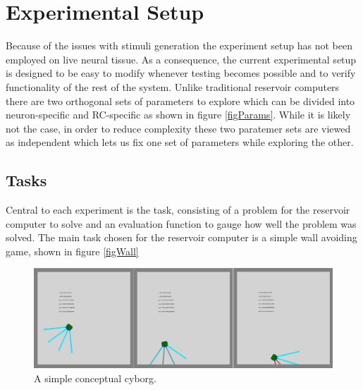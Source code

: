 \chapter{Experimental Setup}
Because of the issues with stimuli generation the experiment setup has not been
employed on live neural tissue.
As a consequence, the current experimental setup is designed to be easy to
modify whenever testing becomes possible and to verify functionality of the rest
of the system.
Unlike traditional reservoir computers there are two orthogonal sets of
parameters to explore which can be divided into neuron-specific and RC-specific
as shown in figure \ref{figParams}.
While it is likely not the case, in order to reduce complexity these two
paratemer sets are viewed as independent which lets us fix one set of parameters
while exploring the other.
\section{Tasks}
Central to each experiment is the task, consisting of a problem for the
reservoir computer to solve and an evaluation function to gauge how well the
problem was solved.
The main task chosen for the reservoir computer is a simple wall avoiding game,
shown in figure \ref{figWall}

\begin{figure}[h!]
  \centering
  \includegraphics[width=1\textwidth]{fig/TAC/game2.png}
  \caption{A simple conceptual cyborg.}
  \label{cyborgOverviewSimple}
\end{figure}
\cleardoublepage

